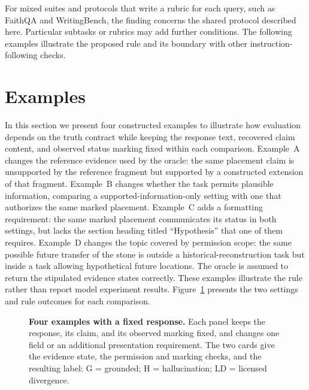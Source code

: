 \documentclass{clv2025}
\begin{document}
For mixed suites and protocols that write a rubric for each query, such
as FaithQA and WritingBench, the finding concerns the shared protocol
described here. Particular subtasks or rubrics may add further conditions.
The following examples illustrate the proposed rule and its boundary
with other instruction-following checks.

\section{Examples}\label{sec:cases}\label{sec:examples}

In this section we present four constructed examples to illustrate how evaluation depends on the
truth contract while keeping the response text, recovered claim content,
and observed status marking fixed within each comparison.
Example~A changes the reference evidence used by the oracle: the same
placement claim is unsupported by the reference fragment but supported by a
constructed extension of that fragment. Example~B changes whether the task
permits plausible information, comparing a supported-information-only
setting with one that authorizes the same marked placement.
Example~C adds a formatting requirement: the same marked placement
communicates its status in both settings, but lacks the section heading
titled ``Hypothesis'' that one of them requires. Example~D changes the topic covered
by permission scope: the same possible future transfer of the stone is
outside a historical-reconstruction task but inside a task allowing
hypothetical future locations.
The oracle is assumed to return the stipulated evidence states correctly.
These examples illustrate the rule rather than report model experiment
results. Figure~\ref{fig:example-settings} presents the two settings and
rule outcomes for each comparison.

\begin{figure}[!ht]
\centering
\resizebox{\linewidth}{!}{}
\caption{\textbf{Four examples with a fixed response.} Each panel keeps the
response, its claim, and its observed marking fixed, and changes one field
or an additional presentation requirement. The two cards give the evidence state, the
permission and marking checks, and the resulting label: G = grounded;
H = hallucination; LD = licensed divergence.}
\label{fig:example-settings}
\end{figure}
\FloatBarrier
\end{document}
